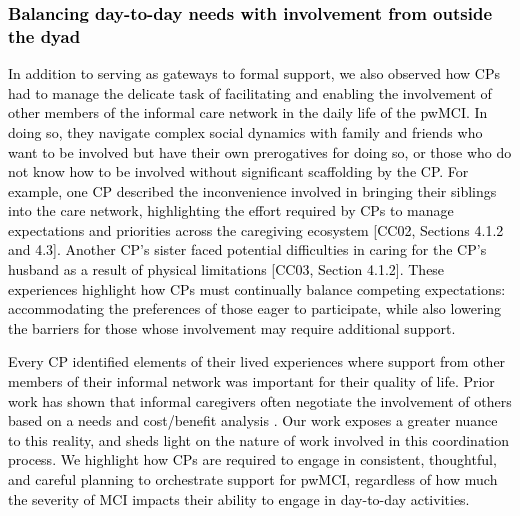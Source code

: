 \documentclass[acmsmall]{acmart}
\begin{document}
\textcolor{black}{\subsubsection{Balancing day-to-day needs with involvement from outside the dyad}
In addition to serving as gateways to formal support, we also observed how CPs had to manage the delicate task of \textcolor{black}{facilitating and enabling the involvement  of other members of the informal care network  in the daily life of the pwMCI.} In doing so, they navigate complex social dynamics with family and friends who want to be involved but have their own prerogatives for doing so, or those who do not know how to be involved without significant scaffolding by the CP. For example, \textcolor{black}{one CP described the} inconvenience involved in bringing their siblings into the care network\textcolor{black}{,} highlight\textcolor{black}{ing} the effort required by CPs to manage expectations and priorities across the caregiving ecosystem \textcolor{black}{[CC02, Sections 4.1.2 and 4.3]}. \textcolor{black}{Another CP's} sister faced \textcolor{black}{potential} difficulties in caring for \textcolor{black}{the CP's} husband as a result of \textcolor{black}{physical} limitations \textcolor{black}{[CC03, Section 4.1.2]}. These experiences highlight how CPs must continually balance competing expectations: accommodating the preferences of those eager to participate, while also lowering the barriers for those whose involvement may require additional support.}  

\textcolor{black}{Every CP identified elements of their lived experiences where support from other members of their informal network was important for their quality of life. Prior work has shown that informal caregivers often negotiate the involvement of others based on a need\textcolor{black}{s} and cost/benefit analysis \cite{schurgin2021isolation}. Our work exposes a greater nuance to this reality, and sheds light on the nature of work involved in this coordination process. We highlight how CPs are required to engage in consistent, thoughtful, and careful planning to orchestrate support for pwMCI, regardless of how much the severity of MCI impacts their ability to engage in day-to-day activities.}
\end{document}
